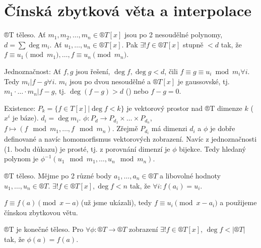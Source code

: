 \documentclass[12pt]{article}                   %
\begin{document}
\section{Čínská zbytková věta a interpolace}
    \begin{veta}
        ®T těleso. Ať $m_1, m_2, …, m_n \in ®T[x]$ jsou po 2 nesoudělné polynomy, $d = \sum \deg m_i$. Ať $u_1, …, u_n \in ®T[x]$. Pak $\exists! f \in ®T[x]$ stupně $<d$ tak, že $f ≡ u_1 \pmod{m_1}, …, f ≡ u_n \pmod{m_n}$.

        \begin{dukazin}
            Jednoznačnost: Ať $f, g$ jsou řešení, $\deg f, \deg g < d$, čili $f≡g≡u_i \bmod m_i \forall i$. Tedy $m_i | f-g \forall i$. $m_i$ jsou po dvou nesoudělné a $®T[x]$ je gaussovské, tj. $m_1·…·m_n |f - g$, tj. $\deg(f-g) > d$ (\lightning) nebo $f-g = 0$.

            Existence: $P_k = \{f \in T[x]|\deg f < k\}$ je vektorový prostor nad ®T dimenze $k$ ($x^i$ je báze). $d_i = \deg m_i$. $\phi: P_d \rightarrow P_{d_1}\times … \times P_{d_n}$, $f \mapsto (f \mod m_1, …, f \mod m_n)$. Zřejmě $P_{d_i}$ má dimenzi $d_i$ a $\phi$ je dobře definované a navíc homomorfismus vektorových zobrazení. Navíc z jednoznačnosti (1. bodu důkazu) je prosté, tj. z porovnání dimenzí je $\phi$ bijekce. Tedy hledaný polynom je $\phi^{-1}(u_1 \mod m_1, …, u_n \mod m_n)$.
        \end{dukazin}
    \end{veta}


    \begin{dusledek}
        ®T těleso. Mějme po 2 různé body $a_1, …, a_n \in ®T$ a libovolné hodnoty $u_1, …, u_n \in ®T$. $\exists! f \in ®T[x], \deg f < n$ tak, že $\forall i: f(a_i) = u_i$.

        \begin{dukazin}
            $f ≡ f(a)\pmod{x - a}$ (už jsme ukázali), tedy $f ≡ u_i \pmod{x - a_i}$ a použijeme čínskou zbytkovou větu.
        \end{dukazin}
    \end{dusledek}

    \begin{dusledek}
        ®T je konečné těleso. Pro $\forall \phi: ®T \rightarrow ®T$ zobrazení $\exists! f \in ®T[x]$, $\deg f < |®T|$ tak, že $\phi(a) = f(a)$.
    \end{dusledek}
\end{document}
